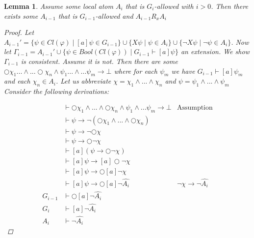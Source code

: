 \documentclass[11pt]{article}
\newtheorem{lemma}[theorem]{Lemma}
\theoremstyle{definition}
\theoremstyle{remark}
\begin{document}
\begin{lemma}
    Assume some local atom $A_i$ that is $G_i$-allowed with $i > 0$. Then there exists some $A_{i-1}$ that is $G_{i-1}$-allowed and $A_{i-1} R_x A_i$

    \begin{proof}
        Let $A_{i-1}' = \{\psi \in Cl(\varphi) \mid [a]\psi \in G_{i-1}\} \cup \{X \psi \mid \psi \in A_i\} \cup \{\neg X \psi \mid \neg \psi \in A_i\}$. Now let $\Gamma_{i-1} = A_{i-1}'  \cup \{\psi \in Bool(Cl(\varphi)) \mid G_{i-1} \vdash [a] \psi\}$ an extension.
        We show $\Gamma_{i-1}$ is consistent. Assume it is not. Then there are some $\bigcirc \chi_1 ... \land ... \bigcirc\chi_n \land \psi_1 ... \land ... \psi_m \rightarrow \bot$ where for each $\psi_m$ we have $G_{i-1} \vdash [a]\psi_m$ and each $\chi_n \in A_i$. Let us abbreviate $\chi = \chi_1 \land ... \land \chi_n$
        and $\psi = \psi_1 \land ... \land \psi_m$
        Consider the following derivations: 

        \[
        \begin{array}{rll}
            & \vdash \bigcirc \chi_1 \land ... \land \bigcirc \chi_n \land \psi_1 \land ... \psi_m \rightarrow \bot
            &\text{Assumption} \\
            & \vdash \psi \rightarrow \neg (\bigcirc \chi_1 \land ... \land \bigcirc \chi_n) \\
            & \vdash \psi\rightarrow \neg \bigcirc \chi \\
            & \vdash \psi \rightarrow \bigcirc \neg \chi \\
            & \vdash [a](\psi \rightarrow \bigcirc \neg \chi) \\
            & \vdash [a] \psi \rightarrow [a] \bigcirc \neg \chi \\
            & \vdash [a] \psi \rightarrow \bigcirc [a] \neg \chi \\
            & \vdash [a] \psi \rightarrow \bigcirc [a] \neg \hat{A_i} 
            & \text {$\neg \chi \rightarrow \neg \hat{A_i}$} \\
            G_{i-1} &\vdash \bigcirc [a] \neg \hat{A_i} \\
            G_{i}  &\vdash [a] \neg \hat{A_i} \\
            A_i &\vdash \neg \hat{A_i}
        \end{array}
        \]
        

\end{proof}
\end{lemma}
\end{document}
